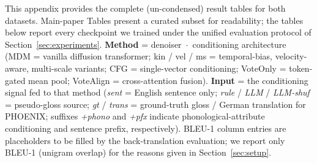 \documentclass{article}
\begin{document}
This appendix provides the complete (un-condensed) result tables for both datasets.
Main-paper Tables present a curated subset for readability; the tables below report every checkpoint we trained under the unified evaluation protocol of Section~\ref{sec:experiments}.
\textbf{Method} = denoiser~$\cdot$~conditioning architecture (MDM = vanilla diffusion transformer; kin / vel / ms = temporal-bias, velocity-aware, multi-scale variants; CFG = single-vector conditioning; VoteOnly = token-gated mean pool; VoteAlign = cross-attention fusion).
\textbf{Input} = the conditioning signal fed to that method (\emph{sent} = English sentence only; \emph{rule} / \emph{LLM} / \emph{LLM-shuf} = pseudo-gloss source; \emph{gt} / \emph{trans} = ground-truth gloss / German translation for PHOENIX; suffixes \emph{+phono} and \emph{+pfx} indicate phonological-attribute conditioning and sentence prefix, respectively).
BLEU-1 column entries are placeholders to be filled by the back-translation evaluation; we report only BLEU-1 (unigram overlap) for the reasons given in Section~\ref{sec:setup}.
\end{document}
